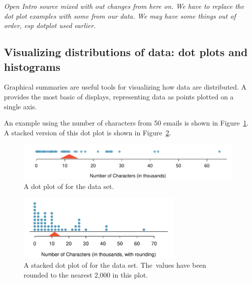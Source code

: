 \begin{doublespace}
\textit{Open Intro source mixed with out changes from here on.  We have to replace the dot plot examples with some from our data.  We may have some things out of order, esp dotplot used earlier.}

\subsection{Visualizing distributions of data: dot plots and histograms}
\label{DotPlotsAndHistograms}

Graphical summaries are useful tools for visualizing how data are distributed. A  provides the most basic of displays, representing data as points plotted on a single axis. 

An example using the number of characters from 50 emails is shown in Figure~\ref{emailCharactersDotPlot}. A stacked version of this dot plot is shown in Figure~\ref{emailCharactersDotPlotStacked}.

\begin{figure}[h]
	\centering
	\includegraphics[width=\textwidth]{ch_intro_to_data_oi_biostat/figures/emailCharactersDotPlot/emailCharactersDotPlot}
	\caption{A dot plot of  for the  data set.}
	\label{emailCharactersDotPlot}
\end{figure}

\begin{figure}[h]
	\centering
	\includegraphics[width=0.72\textwidth]{ch_intro_to_data_oi_biostat/figures/emailCharactersDotPlot/emailCharactersDotPlotStacked}
	\caption{A stacked dot plot of  for the  data set. The~values have been rounded to the nearest 2,000 in this plot.}
	\label{emailCharactersDotPlotStacked}
\end{figure}


\end{doublespace}
